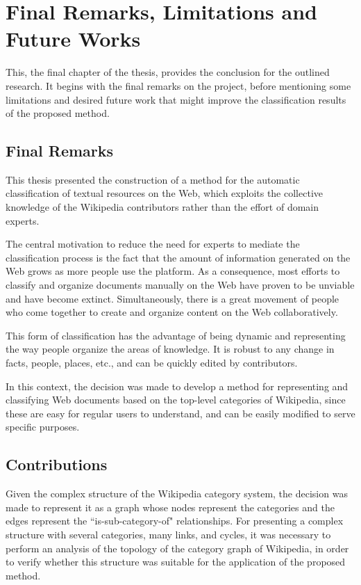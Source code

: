 \chapter{\hspace*{3pt} Final Remarks, Limitations and Future Works}
\label{chapter:conclusion}

This, the final chapter of the thesis, provides the conclusion for the outlined research.  It begins with the final remarks on the project, before mentioning some limitations and desired future work that might improve the classification results of the proposed method.

\section{\hspace*{3pt}  Final Remarks}

This thesis presented the construction of a method for the automatic classification of textual resources on the Web, which exploits the collective knowledge of the Wikipedia contributors rather than the effort of domain experts.

The central motivation to reduce the need for experts to mediate the classification process is the fact that the amount of information generated on the Web grows as more people use the platform. As a consequence, most efforts to classify and organize documents manually on the Web have proven to be unviable and have become extinct. Simultaneously, there is a great movement of people who come together to create and organize content on the Web collaboratively.

This form of classification has the advantage of being dynamic and representing the way people organize the areas of knowledge. It is robust to any change in facts, people, places, etc., and can be quickly edited by contributors. 

In this context, the decision was made to develop a method for representing and classifying Web documents based on the top-level categories of Wikipedia, since these are easy for regular users to understand, and can be easily modified to serve specific purposes.



\section{\hspace*{3pt} Contributions}

Given the complex structure of the Wikipedia category system, the decision was made to represent it as a graph whose nodes represent the categories and the edges represent the ``is-sub-category-of" relationships. For presenting a complex structure with several categories, many links, and cycles, it was necessary to perform an analysis of the topology of the category graph of Wikipedia, in order to verify whether this structure was suitable for the application of the proposed method.

